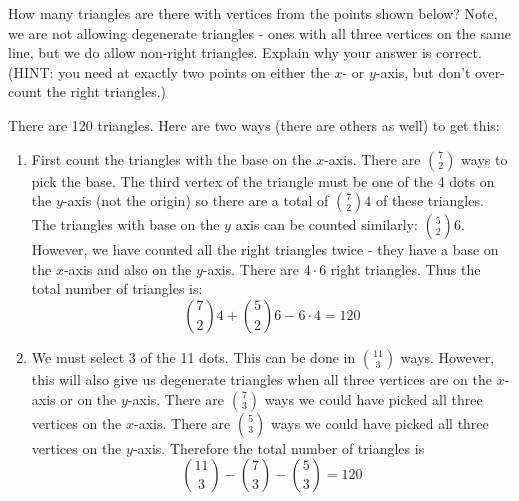 \begin{questions}
\begin{parts}
	
\end{parts}



\question How many triangles are there with vertices from the points shown below?  Note, we are not allowing degenerate triangles - ones with all three vertices on the same line, but we do allow non-right triangles.  Explain why your answer is correct. (HINT: you need at exactly two points on either the $x$- or $y$-axis, but don't over-count the right triangles.)

\begin{center}
\end{center}

\begin{solution}
  There are 120 triangles.  Here are two ways (there are others as well) to get this:
  
  \begin{enumerate}
    \item First count the triangles with the base on the $x$-axis.  There are ${7 \choose 2}$ ways to pick the base.  The third vertex of the triangle must be one of the 4 dots on the $y$-axis (not the origin) so there are a total of ${7 \choose 2}4$ of these triangles.  The triangles with base on the $y$ axis can be counted similarly: ${5 \choose 2}6$.  However, we have counted all the right triangles twice - they have a base on the $x$-axis and also on the $y$-axis.  There are $4 \cdot 6$ right triangles.  Thus the total number of triangles is:
    \[{7 \choose 2}4 + {5 \choose 2}6 - 6\cdot 4 = 120\]
    \item We must select 3 of the 11 dots.  This can be done in ${11 \choose 3}$ ways.  However, this will also give us degenerate triangles when all three vertices are on the $x$-axis or on the $y$-axis.  There are ${7 \choose 3}$ ways we could have picked all three vertices on the $x$-axis.  There are ${5 \choose 3}$ ways we could have picked all three vertices on the $y$-axis.  Therefore the total number of triangles is
    \[{11 \choose 3} - {7 \choose 3} - {5 \choose 3} = 120\]
  \end{enumerate}

\end{solution}




\end{questions}

